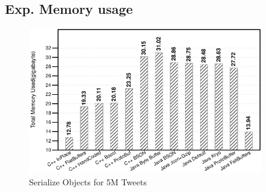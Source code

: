 \subsection{Exp. Memory usage}

\begin{figure}
	\centering
	\includegraphics[width=\columnwidth,height=2.5in,keepaspectratio]{../../RScripts/Experiment_ReadObjects_Memory.pdf}
	\caption{Serialize Objects for 5M Tweets}
	\label{fig:exp_memory}
\end{figure}